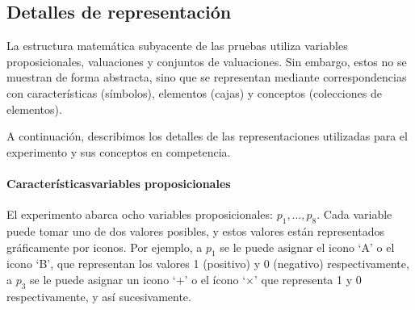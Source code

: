 \subsection{Detalles de representación}\label{sub:experimentdetails} 


La estructura matemática subyacente de las pruebas utiliza variables proposicionales, valuaciones y conjuntos de valuaciones. Sin embargo, estos no se muestran de forma abstracta, sino que se representan mediante correspondencias con características (símbolos), elementos (cajas) y conceptos (colecciones de elementos).

A continuación, describimos los detalles de las representaciones utilizadas para el experimento y sus conceptos en competencia.

\paragraph{Características\textemdash variables proposicionales}

El experimento abarca ocho variables proposicionales: $ p_1, \dots, p_8 $. Cada variable puede tomar uno de dos valores posibles, y estos valores están representados gráficamente por iconos. Por ejemplo, a $ p_1 $ se le puede asignar el icono `A' o el icono `B', que representan los valores 1 (positivo) y 0 (negativo) respectivamente, a $ p_3 $ se le puede asignar un icono `$ + $' o el ícono `$\times$' que representa 1 y 0 respectivamente, y así sucesivamente.


